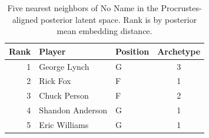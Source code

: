 \begin{table}[htbp]
  \centering\small
  \begin{tabular}{rllc}
    \toprule
    Rank & Player & Position & Archetype \\
    \midrule
    1 & George Lynch & G & 3 \\
    2 & Rick Fox & F & 1 \\
    3 & Chuck Person & F & 2 \\
    4 & Shandon Anderson & G & 1 \\
    5 & Eric Williams & G & 1 \\
    \bottomrule
  \end{tabular}
  \caption{Five nearest neighbors of No Name in the Procrustes-aligned posterior latent space. Rank is by posterior mean embedding distance.}
  \label{tab:No_Name_neighbors}
\end{table}

